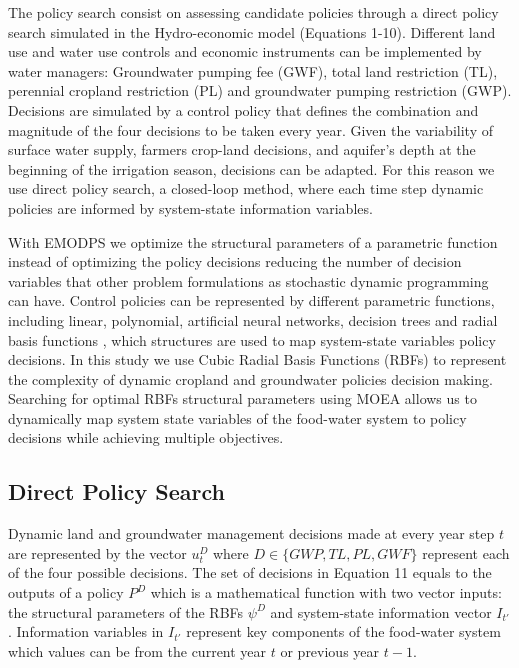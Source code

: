 \documentclass[11pt,a4paper]{article}
\begin{document}
The policy search consist on assessing candidate policies through a direct policy search simulated in the Hydro-economic model (Equations 1-10). Different land use and water use controls and economic instruments can be implemented by water managers: Groundwater pumping fee (GWF), total land restriction (TL), perennial cropland restriction (PL) and groundwater pumping restriction (GWP). Decisions are simulated by a control policy that defines the combination and magnitude of the four decisions to be taken every year. Given the variability of surface water supply, farmers crop-land decisions, and aquifer's depth at the beginning of the irrigation season, decisions can be adapted. For this reason we use direct policy search, a closed-loop method, where each time step dynamic policies are informed by system-state information variables. 

With EMODPS we optimize the structural parameters of a parametric function instead of optimizing the policy decisions reducing the number of decision variables that other problem formulations as stochastic dynamic programming can have. Control policies can be represented by different  parametric functions, including linear, polynomial, artificial neural networks, decision trees and radial basis functions \cite{giuliani_universal_2014}, which structures are used to map system-state variables policy decisions. In this study we use Cubic Radial Basis Functions (RBFs) to represent the complexity of dynamic cropland and groundwater policies decision making. Searching for optimal RBFs structural parameters using MOEA allows us to dynamically map system state variables of the food-water system to policy decisions while achieving multiple objectives.

\subsection{Direct Policy Search}

Dynamic land and groundwater management decisions made at every year step $t$ are represented by the vector $u_{t}^D$ where $D \in \{GWP,TL,PL,GWF\}$ represent each of the four possible decisions. The set of decisions in Equation 11 equals to the outputs of a policy $P^D$ which is a mathematical function with two vector inputs: the structural parameters of the RBFs $\psi^D$ and system-state information vector $I_{t'}$. Information variables in $I_{t'}$ represent key components of the food-water system which values can be from the current year $t$ or previous year $t-1$. 
\end{document}
